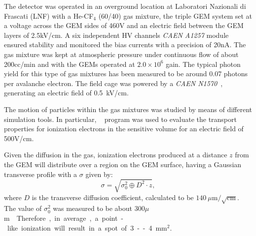 \documentclass[12pt]{iopart}
\begin{document}
The \lemon detector was operated in an overground location at
Laboratori Nazionali di Frascati (LNF) with a He-CF$_4$ (60/40) gas
mixture, the triple GEM system set at a voltage across the GEM sides
of 460\unit{V} and an electric field between the GEM layers of
2.5\unit{kV/cm}. A six independent HV channels \textit{CAEN A1257}
module
ensured stability and monitored the bias currents with a precision
of 20\unit{nA}. The gas mixture was kept at atmospheric pressure under
continuous flow of about 200\unit{cc/min} and with the GEMs operated
at $2.0\times10^6$ gain. The typical photon yield
for this type of gas mixtures has been measured to be around 0.07
photons per avalanche electron\cite{bib:jinst_orange1, bib:roby,
  bib:tesinatalia}. The field cage was powered by a \textit{CAEN
  N1570}~\cite{CAENN1570}, generating an electric field of 0.5~kV/cm.
  
The motion of particles within the gas mixtures was studied by means
of different simulation tools. In particular,
\garfield~\cite{bib:garfield,bib:garfield1} program was used to
evaluate the transport properties for ionization electrons in the
sensitive volume for an electric field of 500\unit{V/cm}.

Given the diffusion in the gas, ionization electrons produced at a
distance $z$ from the GEM will distribute over a region on the GEM
surface, having a Gaussian transverse profile with a $\sigma$ given by:
%
\begin{equation}
\label{eq:diff}
\sigma = \sqrt{\sigma^2_0 \oplus D^2 \cdot z},
\end{equation}
where $D$ is the transverse diffusion coefficient,
calculated to be
$140~\mu{\mathrm{m}}/\sqrt{\mathrm{cm}}$.
The value of $\sigma^2_0$ was measured to be about
300\unit{$\mu$m} \cite{bib:btf,bib:fe55New}. Therefore, in average, a
point-like ionization will result in a spot of 3--4\unit{mm$^2$}.
\end{document}
